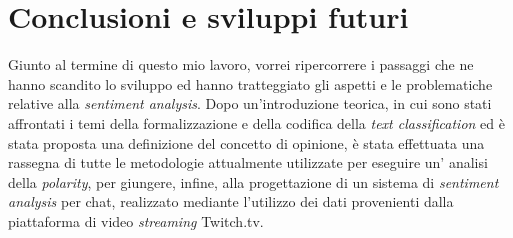 \documentclass[a4paper,12pt,openright,twoside]{report}
\theoremstyle{definition}
\begin{document}


\chapter{Conclusioni e sviluppi futuri}
\label{ch:sviluppi}
Giunto al termine di questo mio lavoro, vorrei ripercorrere i passaggi 
che ne hanno scandito lo sviluppo ed hanno tratteggiato gli aspetti e le 
problematiche relative alla \emph{sentiment analysis}. Dopo un'introduzione teorica, 
in cui sono stati  affrontati i temi della formalizzazione e della codifica della 
\emph{text classification} ed è stata proposta una definizione del concetto di opinione, 
è stata effettuata una rassegna di tutte le metodologie attualmente utilizzate per eseguire un'
analisi della \emph{polarity}, per giungere, infine,  
alla progettazione di un sistema di 
\emph{sentiment analysis} per chat, 
realizzato mediante l'utilizzo dei dati provenienti dalla piattaforma di 
video \emph{streaming} Twitch.tv.
\end{document}
